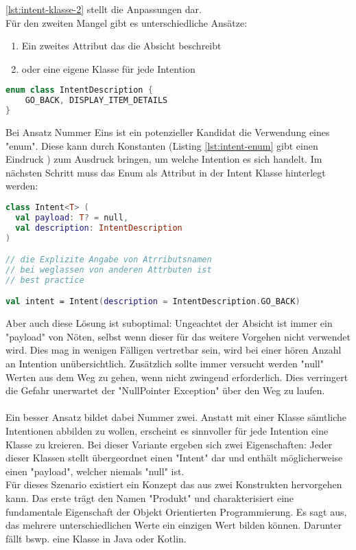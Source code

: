 \ref{lst:intent-klasse-2}
stellt die Anpassungen dar.
\\
Für den zweiten Mangel gibt es unterschiedliche Ansätze:
\begin{enumerate}
	\item Ein zweites Attribut das die Absicht beschreibt
	\item oder eine eigene Klasse für jede Intention
\end{enumerate}
\begin{lstlisting}[caption={Intent Enum}, label={lst:intent-enum}, language=Kotlin]
enum class IntentDescription {
	GO_BACK, DISPLAY_ITEM_DETAILS
}
\end{lstlisting}
\bigskip
Bei Ansatz Nummer Eins ist ein potenzieller Kandidat die Verwendung eines "enum". Diese kann durch Konstanten (Listing 
\ref{lst:intent-enum} gibt einen Eindruck
) zum Ausdruck bringen, um welche Intention es sich handelt. Im nächsten Schritt muss das Enum als Attribut in der Intent Klasse hinterlegt werden:
\begin{lstlisting}[caption={Intent Klasse}, label={lst:intent-klasse-2}, language=Kotlin]
class Intent<T> (
  val payload: T? = null, 
  val description: IntentDescription
)

// die Explizite Angabe von Atrributsnamen
// bei weglassen von anderen Attrbuten ist
// best practice

val intent = Intent(description = IntentDescription.GO_BACK)
\end{lstlisting}
\bigskip
Aber auch diese Lösung ist suboptimal: Ungeachtet der Absicht ist immer ein "payload" von Nöten, selbst wenn dieser für das weitere Vorgehen nicht verwendet wird. Dies mag in wenigen Fälligen vertretbar sein, wird bei einer hören Anzahl an Intention unübersichtlich. Zusätzlich sollte immer versucht werden "null" Werten aus dem Weg zu gehen, wenn nicht zwingend erforderlich. Dies verringert die Gefahr unerwartet der "NullPointer Exception" über den Weg zu laufen.
\\
\\
Ein besser Ansatz bildet dabei Nummer zwei. Anstatt mit einer Klasse sämtliche Intentionen abbilden zu wollen, erscheint es sinnvoller für jede Intention eine Klasse zu kreieren. Bei dieser Variante ergeben sich zwei Eigenschaften: Jeder dieser Klassen stellt übergeordnet einen "Intent" dar und enthält möglicherweise einen "payload", welcher niemals "null" ist.
\\
Für dieses Szenario existiert ein Konzept das aus zwei Konstrukten hervorgehen kann. Das erste trägt den Namen "Produkt" und charakterisiert eine fundamentale Eigenschaft der Objekt Orientierten Programmierung. Es sagt aus, das mehrere unterschiedlichen Werte ein einzigen Wert bilden können. Darunter fällt bswp. eine Klasse in Java oder Kotlin.
